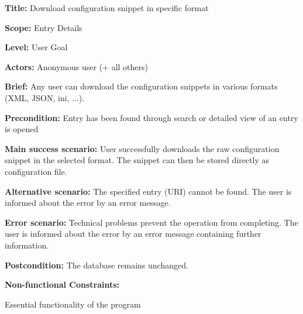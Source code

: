 
\begin{DoxyItemize}
\item {\bfseries Title\+:} Download configuration snippet in specific format
\item {\bfseries Scope\+:} Entry Details
\item {\bfseries Level\+:} User Goal
\item {\bfseries Actors\+:} Anonymous user (+ all others)
\item {\bfseries Brief\+:} Any user can download the configuration snippets in various formats (X\+ML, J\+S\+ON, ini, ...).
\end{DoxyItemize}


\begin{DoxyItemize}
\item {\bfseries Precondition\+:} Entry has been found through search or detailed view of an entry is opened
\item {\bfseries Main success scenario\+:} User successfully downloads the raw configuration snippet in the selected format. The snippet can then be stored directly as configuration file.
\item {\bfseries Alternative scenario\+:} The specified entry (U\+RI) cannot be found. The user is informed about the error by an error message.
\item {\bfseries Error scenario\+:} Technical problems prevent the operation from completing. The user is informed about the error by an error message containing further information.
\item {\bfseries Postcondition\+:} The database remains unchanged.
\item {\bfseries Non-\/functional Constraints\+:}
\begin{DoxyItemize}
\item Essential functionality of the program 
\end{DoxyItemize}
\end{DoxyItemize}